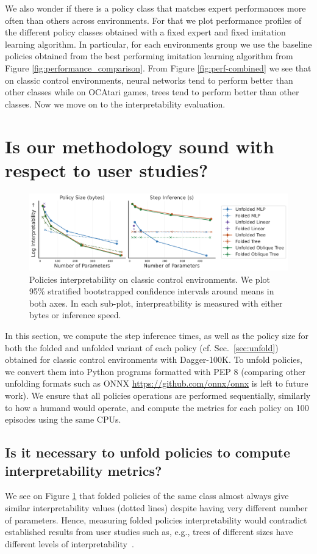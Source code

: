 We also wonder if there is a policy class that matches expert performances more often than others across environments.
For that we plot performance profiles of the different policy classes obtained with a fixed expert and fixed imitation learning algorithm.
In particular, for each environments group we use the baseline policies obtained from the best performing imitation learning algorithm from Figure \ref{fig:performance_comparison}.
From Figure \ref{fig:perf-combined} we see that on classic control environments, neural networks tend to perform better than other classes while on OCAtari games, trees tend to perform better than other classes.
Now we move on to the interpretability evaluation.

\section{Is our methodology sound with respect to user studies?}

\begin{figure}
    \centering
    \includegraphics[width=1\linewidth]{images/images_part3/tree_sizes_memory_ppo_ci_ablation.pdf}
    \caption{Policies interpretability on classic control environments. We plot 95\% stratified bootstrapped confidence intervals around means in both axes. In each sub-plot, interpreatbility is measured with either bytes or inference speed.}
    \label{fig:abl-proxies}
\end{figure}

In this section, we compute the step inference times, as well as the policy size for both the folded and unfolded variant of each policy (cf. Sec.~\ref{sec:unfold}) obtained for classic control environments with Dagger-100K.
To unfold policies, we convert them into Python programs formatted with PEP 8 (comparing other unfolding formats such as ONNX \url{https://github.com/onnx/onnx} is left to future work).
We ensure that all policies operations are performed sequentially, similarly to how a humand would operate, and compute the metrics for each policy on 100 episodes using the same CPUs.

\subsection{Is it necessary to unfold policies to compute interpretability metrics?}
We see on Figure \ref{fig:abl-proxies} that folded policies of the same class almost always give similar interpretability values (dotted lines) despite having very different number of parameters.
Hence, measuring folded policies interpretability would contradict established results from user studies such as, e.g., trees of different sizes have different levels of interpretability~\cite{study-4}. 

